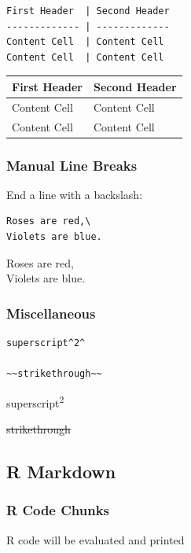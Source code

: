 \documentclass[]{book}
\newenvironment{Shaded}{\begin{snugshade}}{\end{snugshade}}
\newcommand{\KeywordTok}[1]{\textcolor[rgb]{0.13,0.29,0.53}{\textbf{#1}}}
\newcommand{\OperatorTok}[1]{\textcolor[rgb]{0.81,0.36,0.00}{\textbf{#1}}}
\newcommand{\NormalTok}[1]{#1}
\theoremstyle{definition}
\theoremstyle{definition}
\theoremstyle{definition}
\theoremstyle{remark}
\begin{document}
\begin{verbatim}
First Header  | Second Header
------------- | -------------
Content Cell  | Content Cell
Content Cell  | Content Cell
\end{verbatim}

\begin{longtable}[]{@{}ll@{}}
\toprule
First Header & Second Header\tabularnewline
\midrule
\endhead
Content Cell & Content Cell\tabularnewline
Content Cell & Content Cell\tabularnewline
\bottomrule
\end{longtable}

\subsubsection{Manual Line Breaks}\label{manual-line-breaks}

End a line with a backslash:

\begin{verbatim}
Roses are red,\
Violets are blue.
\end{verbatim}

Roses are red,\\
Violets are blue.

\subsubsection{Miscellaneous}\label{miscellaneous}

\begin{verbatim}
superscript^2^

~~strikethrough~~
\end{verbatim}

superscript\textsuperscript{2}

\sout{strikethrough}

\subsection{R Markdown}\label{r-markdown-1}

\subsubsection{R Code Chunks}\label{r-code-chunks}

R code will be evaluated and printed

\begin{Shaded}
\end{Shaded}
\end{document}
